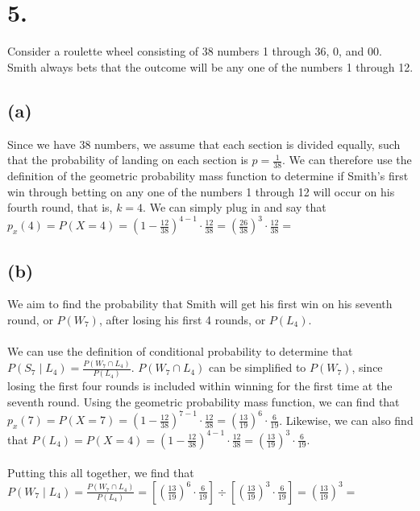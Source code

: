 \documentclass{article}
\begin{document}
\section*{5.}
{\Large 

Consider a roulette wheel consisting of 38 numbers 1 through 36, 0, and 00. Smith always bets
that the outcome will be any one of the numbers 1 through 12.

\subsection*{(a)}
Since we have 38 numbers, we assume that each section is divided equally, such that the probability of landing on each section is $p = \frac{1}{38}$. We can therefore use the definition of the geometric probability mass function to determine if Smith's first win through betting on any one of the numbers 1 through 12 will occur on his fourth round, that is, $k = 4$. We can simply plug in and say that $p_x(4) = P(X = 4) = (1 - \frac{12}{38})^{4-1} \cdot \frac{12}{38} = (\frac{26}{38})^3 \cdot \frac{12}{38} = $ 

\subsection*{(b)}
We aim to find the probability that Smith will get his first win on his seventh round, or $P(W_7)$, after losing his first 4 rounds, or $P(L_4)$. \\ \\
We can use the definition of conditional probability to determine that $P(S_7 \mid L_4) = \frac{P(W_7 \cap L_4)}{P(L_4)}$. $P(W_7 \cap L_4)$ can be simplified to $P(W_7)$, since losing the first four rounds is included within winning for the first time at the seventh round. Using the geometric probability mass function, we can find that $p_x(7) = P(X = 7) = (1 - \frac{12}{38})^{7-1} \cdot \frac{12}{38} = (\frac{13}{19})^6 \cdot \frac{6}{19}$. Likewise, we can also find that $P(L_4) = P(X = 4) = (1 - \frac{12}{38})^{4-1} \cdot \frac{12}{38} = (\frac{13}{19})^3 \cdot \frac{6}{19}$. \\ \\
Putting this all together, we find that $P(W_7 \mid L_4) = \frac{P(W_7 \cap L_4)}{P(L_4)} = [(\frac{13}{19})^6 \cdot \frac{6}{19}] \div [(\frac{13}{19})^3 \cdot \frac{6}{19}] = (\frac{13}{19})^3 = $ 

}
\end{document}
